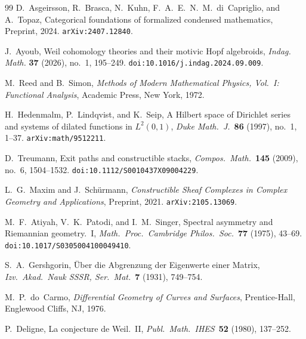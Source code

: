 \documentclass[11pt]{article}
\begin{document}
\begin{thebibliography}{99}
D.~Asgeirsson, R.~Brasca, N.~Kuhn, F.~A.~E.~N.~M.~di~Capriglio, and A.~Topaz,
Categorical foundations of formalized condensed mathematics,
Preprint, 2024.  \texttt{arXiv:2407.12840}.

J.~Ayoub,
Weil cohomology theories and their motivic Hopf algebroids,
\textit{Indag. Math.} \textbf{37} (2026), no.~1, 195--249.
\texttt{doi:10.1016/j.indag.2024.09.009}.

M.~Reed and B.~Simon,
\textit{Methods of Modern Mathematical Physics, Vol.~I: Functional Analysis},
Academic Press, New York, 1972.

H.~Hedenmalm, P.~Lindqvist, and K.~Seip,
A Hilbert space of Dirichlet series and systems of dilated functions in
$L^2(0,1)$,
\textit{Duke Math.\ J.}\ \textbf{86} (1997), no.\ 1, 1--37.
\texttt{arXiv:math/9512211}.

D.~Treumann,
Exit paths and constructible stacks,
\textit{Compos.\ Math.}\ \textbf{145} (2009), no.\ 6, 1504--1532.
\texttt{doi:10.1112/S0010437X09004229}.

L.~G.~Maxim and J.~Sch\"urmann,
\textit{Constructible Sheaf Complexes in Complex Geometry and Applications},
Preprint, 2021.  \texttt{arXiv:2105.13069}.

M.~F.~Atiyah, V.~K.~Patodi, and I.~M.~Singer,
Spectral asymmetry and Riemannian geometry.\ I,
\textit{Math.\ Proc.\ Cambridge Philos.\ Soc.}\ \textbf{77} (1975), 43--69.
\texttt{doi:10.1017/S0305004100049410}.

S.~A.~Gershgorin,
\"Uber die Abgrenzung der Eigenwerte einer Matrix,
\textit{Izv.~Akad.~Nauk SSSR, Ser.~Mat.}\ \textbf{7} (1931), 749--754.





M.~P.~do~Carmo,
\textit{Differential Geometry of Curves and Surfaces},
Prentice-Hall, Englewood Cliffs, NJ, 1976.





P.~Deligne,
La conjecture de Weil.\ II,
\textit{Publ.\ Math.\ IHES}\ \textbf{52} (1980), 137--252.

\end{thebibliography}
\end{document}
